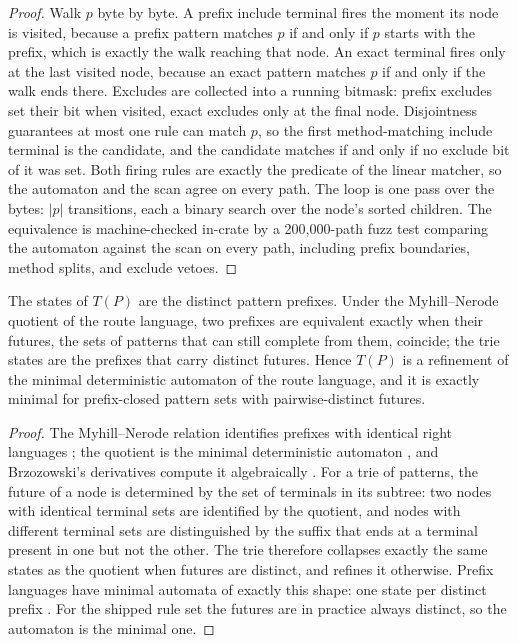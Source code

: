 \begin{proof}
Walk $p$ byte by byte. A prefix include terminal fires the moment its
node is visited, because a prefix pattern matches $p$ if and only if
$p$ starts with the prefix, which is exactly the walk reaching that
node. An exact terminal fires only at the last visited node, because
an exact pattern matches $p$ if and only if the walk ends there.
Excludes are collected into a running bitmask: prefix excludes set
their bit when visited, exact excludes only at the final node.
Disjointness guarantees at most one rule can match $p$, so the first
method-matching include terminal is the candidate, and the candidate
matches if and only if no exclude bit of it was set. Both firing rules
are exactly the predicate of the linear matcher, so the automaton and
the scan agree on every path. The loop is one pass over the bytes:
$|p|$ transitions, each a binary search over the node's sorted
children. The equivalence is machine-checked in-crate by a
200{,}000-path fuzz test comparing the automaton against the scan on
every path, including prefix boundaries, method splits, and exclude
vetoes.
\end{proof}

\begin{theorem}\label{thm:65}\label{thm:route-mn}
The states of $T (P)$ are the distinct pattern prefixes. Under the
Myhill--Nerode quotient of the route language, two prefixes are
equivalent exactly when their futures, the sets of patterns that can
still complete from them, coincide; the trie states are the prefixes
that carry distinct futures. Hence $T (P)$ is a refinement of the
minimal deterministic automaton of the route language, and it is
exactly minimal for prefix-closed pattern sets with pairwise-distinct
futures.
\end{theorem}

\begin{proof}
The Myhill--Nerode relation identifies prefixes with identical right
languages \citep{nerode}; the quotient is the minimal deterministic
automaton \citep{hopcroft}, and Brzozowski's derivatives compute it
algebraically \citep{brzozowski}. For a trie of patterns, the future
of a node is determined by the set of terminals in its subtree: two
nodes with identical terminal sets are identified by the quotient, and
nodes with different terminal sets are distinguished by the suffix
that ends at a terminal present in one but not the other. The trie
therefore collapses exactly the same states as the quotient when
futures are distinct, and refines it otherwise. Prefix languages have
minimal automata of exactly this shape: one state per distinct prefix
\citep{arxiv-syntactic}. For the shipped rule set the futures are in
practice always distinct, so the automaton is the minimal one.
\end{proof}


